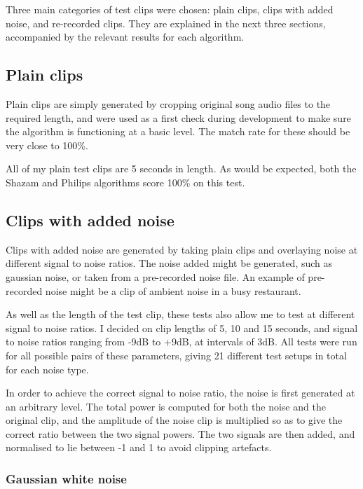 \documentclass[12pt,a4paper,twoside,openright]{report}
\begin{document}
Three main categories of test clips were chosen: plain clips, clips with added noise, and re-recorded clips. They are explained in the next three sections, accompanied by the relevant results for each algorithm.


\subsection{Plain clips}

Plain clips are simply generated by cropping original song audio files to the required length, and were used as a first check during development to make sure the algorithm is functioning at a basic level. The match rate for these should be very close to 100\%.

All of my plain test clips are 5 seconds in length. As would be expected, both the Shazam and Philips algorithms score 100\% on this test.


\subsection{Clips with added noise}

Clips with added noise are generated by taking plain clips and overlaying noise at different signal to noise ratios. The noise added might be generated, such as gaussian noise, or taken from a pre-recorded noise file. An example of pre-recorded noise might be a clip of ambient noise in a busy restaurant.

As well as the length of the test clip, these tests also allow me to test at different signal to noise ratios. I decided on clip lengths of 5, 10 and 15 seconds, and signal to noise ratios ranging from -9dB to +9dB, at intervals of 3dB. All tests were run for all possible pairs of these parameters, giving 21 different test setups in total for each noise type. 

In order to achieve the correct signal to noise ratio, the noise is first generated at an arbitrary level. The total power is computed for both the noise and the original clip, and the amplitude of the noise clip is multiplied so as to give the correct ratio between the two signal powers. The two signals are then added, and normalised to lie between -1 and 1 to avoid clipping artefacts.


\subsubsection{Gaussian white noise}
\end{document}
